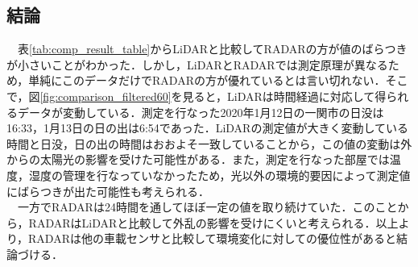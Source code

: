 \subsection{結論}
　表\ref{tab:comp_result_table}からLiDARと比較してRADARの方が値のばらつきが小さいことがわかった．しかし，LiDARとRADARでは測定原理が異なるため，単純にこのデータだけでRADARの方が優れているとは言い切れない．そこで，図\ref{fig:comparison_filtered60}を見ると，LiDARは時間経過に対応して得られるデータが変動している．測定を行なった2020年1月12日の一関市の日没は16:33，1月13日の日の出は6:54であった．LiDARの測定値が大きく変動している時間と日没，日の出の時間はおおよそ一致していることから，この値の変動は外からの太陽光の影響を受けた可能性がある．また，測定を行なった部屋では温度，湿度の管理を行なっていなかったため，光以外の環境的要因によって測定値にばらつきが出た可能性も考えられる．\\
　一方でRADARは24時間を通してほぼ一定の値を取り続けていた．このことから，RADARはLiDARと比較して外乱の影響を受けにくいと考えられる．以上より，RADARは他の車載センサと比較して環境変化に対しての優位性があると結論づける．

